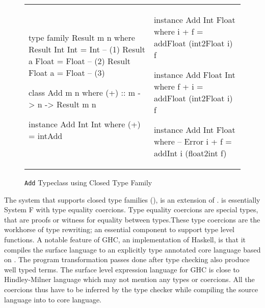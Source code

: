 \documentclass[format=sigplan,manuscript,review,screen,nonacm,margin=1in]{acmart}
\begin{document}
\begin{figure}[ht]
  \begin{tabular}{l l}
\begin{code}
type family Result m n where
  Result Int Int = Int   -- (1)
  Result a Float = Float -- (2)
  Result Float a = Float -- (3)

class Add m n where
  (+) :: m -> n -> Result m n

instance Add Int Int where
  (+) = intAdd
\end{code}&%
\begin{code}
instance Add Int Float where
  i + f = addFloat (int2Float i) f

instance Add Float Int where
  f + i = addFloat (int2Float i) f

instance Add Int Float where -- Error
  i + f = addInt i (float2int f)
    \end{code}
  \end{tabular}
  \caption{\texttt{Add} Typeclass using Closed Type Family}
  \label{fig:add-ty-fam}
\end{figure}
The system that supports closed type families (\CLTF{}), is an extension of \FC\cite{sulzmann_system_2007}.
\FC is essentially System F\cite{girard_proofs_1989,reynolds_towards_1974} with type equality coercions.
Type equality coercions are special types, that are proofs or witness
for equality between types.These type coercions are the workhorse of type rewriting;
an essential component to support type level functions.
A notable feature of GHC, an implementation of Haskell, is that it compiles the surface language
to an explicitly type annotated core language based on \FC. The program transformation
passes done after type checking also produce well typed \FC terms. The surface level expression
language for GHC is close to Hindley-Milner language which may not mention any types or coercions.
All the coercions thus have to be inferred by the type checker while compiling
the source language into to core language. 
\end{document}
